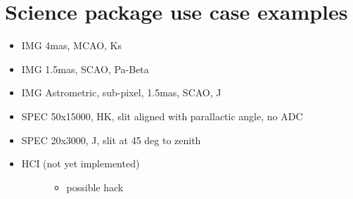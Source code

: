 

\section{Science package use case examples%
  \label{science-package-use-case-examples}%
}

\begin{itemize}
\item IMG 4mas, MCAO, Ks

\item IMG 1.5mas, SCAO, Pa-Beta

\item IMG Astrometric, sub-pixel, 1.5mas, SCAO, J

\item SPEC 50x15000, HK, slit aligned with parallactic angle, no ADC

\item SPEC 20x3000, J, slit at 45 deg to zenith

\item 
\begin{description}
\item[{HCI (not yet implemented)}] \leavevmode 
\begin{itemize}
\item possible hack
\end{itemize}

\end{description}
\end{itemize}
